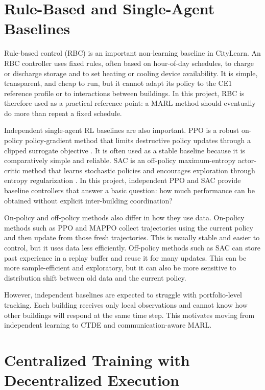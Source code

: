 \section{Rule-Based and Single-Agent Baselines}

Rule-based control (RBC) is an important non-learning baseline in CityLearn.
An RBC controller uses fixed rules, often based on hour-of-day schedules, to
charge or discharge storage and to set heating or cooling device availability.
It is simple, transparent, and cheap to run, but it cannot adapt its policy to
the CE1 reference profile or to interactions between buildings. In this project,
RBC is therefore used as a practical reference point: a MARL method should
eventually do more than repeat a fixed schedule.

Independent single-agent RL baselines are also important. PPO is a robust
on-policy policy-gradient method that limits destructive policy updates through
a clipped surrogate objective \cite{ppo2017}. It is often used as a stable
baseline because it is comparatively simple and reliable. SAC is an off-policy
maximum-entropy actor-critic method that learns stochastic policies and
encourages exploration through entropy regularization \cite{sac2018,
sacApplications2018}. In this project, independent PPO and SAC provide
baseline controllers that answer a basic question: how much performance can be
obtained without explicit inter-building coordination?

On-policy and off-policy methods also differ in how they use data. On-policy
methods such as PPO and MAPPO collect trajectories using the current policy and
then update from those fresh trajectories. This is usually stable and easier to
control, but it uses data less efficiently. Off-policy methods such as SAC can
store past experience in a replay buffer and reuse it for many updates. This can
be more sample-efficient and exploratory, but it can also be more sensitive to
distribution shift between old data and the current policy.

However, independent baselines are expected to struggle with portfolio-level
tracking. Each building receives only local observations and cannot know how
other buildings will respond at the same time step. This motivates moving from
independent learning to CTDE and communication-aware MARL.

\section{Centralized Training with Decentralized Execution}

